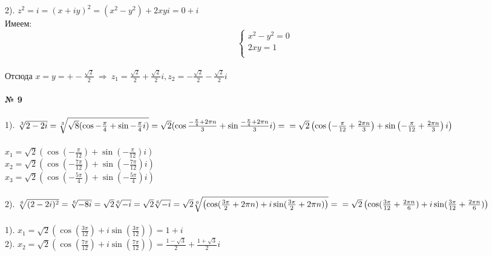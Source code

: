 \documentclass[a4paper, 12pt]{article}
\begin{document}
    \\
    \\ 2). $z^2 = i = (x + iy)^2 = (x^2 - y^2) + 2xy i = 0 + i$
    \\ Имеем:
    \begin{equation*}
        \begin{cases}
            x^2 - y^2 = 0 \\
            2xy = 1 \\
        \end{cases}
    \end{equation*}
    \\ Отсюда $x = y = +-\frac{\sqrt{2}}{2} \ \Rightarrow \ z_1 = \frac{\sqrt{2}}{2} + \frac{\sqrt{2}}{2}i, z_2 = -\frac{\sqrt{2}}{2} - \frac{\sqrt{2}}{2} i$
    \\
    \\ \textbf{№ 9} 
    \\
    \\ 1). $\sqrt[3]{2 -2i} = \sqrt[3]{\sqrt{8}(\cos -\frac{\pi}{4} + \sin -\frac{\pi}{4} i)} = \sqrt{2} (\cos \frac{-\frac{\pi}{4} + 2\pi n}{3} + \sin  \frac{-\frac{\pi}{4} + 2\pi n}{3} i) = 
    \\ = \sqrt{2} \left(\cos \left(-\frac{\pi}{12} + \frac{2\pi n}{3}\right) + \sin  \left(-\frac{\pi}{12} + \frac{2\pi n}{3}\right) i \right)$
    \\
    \\ $x_1 = \sqrt{2} \left(\cos \left(-\frac{\pi}{12}\right) + \sin  \left(-\frac{\pi}{12}\right) i \right)$
    \\ $x_2 = \sqrt{2} \left(\cos \left(-\frac{7\pi}{12}\right) + \sin  \left(-\frac{7\pi}{12}\right) i \right)$
    \\ $x_3 = \sqrt{2} \left(\cos \left(-\frac{5\pi}{4}\right) + \sin  \left(-\frac{5\pi}{4}\right) i \right)$
    \\
    \\ 2). $\sqrt[6]{(2 - 2i)^2} = \sqrt[6]{-8i} = \sqrt{2}\sqrt[6]{-i} = \sqrt{2}\sqrt[6]{-i} = \sqrt{2} \sqrt[6]{\left(\cos (\frac{3\pi}{2} + 2\pi n) + i \sin (\frac{3\pi}{2} + 2\pi n) \right)} = 
    \\ = \sqrt{2} \left(\cos (\frac{3\pi}{12} + \frac{2\pi n}{6}) + i \sin (\frac{3\pi}{12} + \frac{2\pi n}{6}) \right)$
    \\
    \\ 1). $x_1 = \sqrt{2} \left(\cos (\frac{3\pi}{12}) + i \sin (\frac{3\pi}{12}) \right) = 1 + i$
    \\ 2). $x_2 = \sqrt{2} \left(\cos (\frac{7\pi}{12}) + i \sin (\frac{7\pi}{12}) \right) = \frac{1 - \sqrt{3}}{2} + \frac{1 + \sqrt{3}}{2}i$
\end{document}
